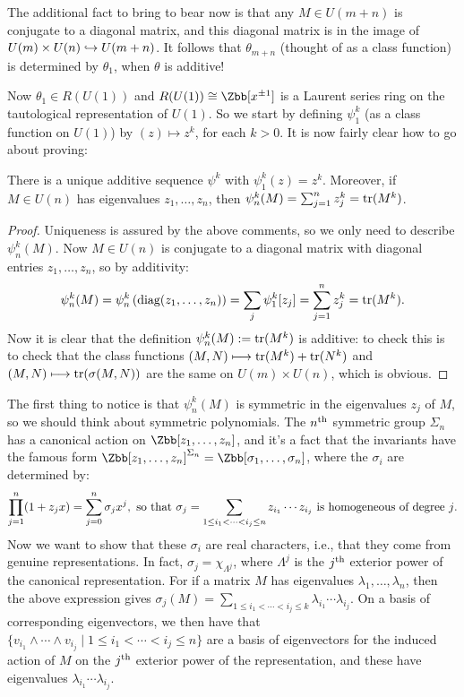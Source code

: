 The additional fact to bring to bear now is that any $M \in U(m+n)$ is conjugate to a diagonal matrix, and this diagonal matrix is in the image of $U(m) \times U(n) \hookrightarrow U(m+n)$.  It follows that $\theta_{m+n}$ (thought of as a class function) is determined by $\theta_1$, when $\theta$ is additive!

Now $\theta_1 \in R(U(1))$ and $R(U(1)) \cong \Zbb[x^{\pm 1}]$ is a Laurent series ring on the tautological representation of $U(1)$.  So we start by defining $\psi_1^k$ (as a class function on $U(1)$) by $(z)\mapsto z^k$, for each $k > 0$.  It is now fairly clear how to go about proving:
\begin{thm}
There is a unique additive sequence $\psi^k$ with $\psi^k_1(z) = z^k$. Moreover, if $M\in U(n)$ has eigenvalues $z_1,\ldots,z_n$, then $\psi_n^k(M)=\sum_{j=1}^n z^k_j=\operatorname{tr}(M^k)$.
\end{thm}
\begin{proof}
Uniqueness is assured by the above comments, so we only need to describe $\psi_n^k(M)$. Now $M \in U(n)$ is conjugate to a diagonal matrix with diagonal entries $z_1, \ldots, z_n$, so by additivity:
\[\psi^k_n(M) = \psi^k_n \left( \textup{diag}(z_1,\ldots,z_n)\right) = \sum_j \psi^k_1 [z_j] = \sum_{j=1}^n z_j^k = \operatorname{tr}(M^k).\]
Now it is clear that the definition $\psi^k_n(M) \mathrel{:=} \operatorname{tr}(M^k)$ is additive: to check this is to check that the class functions $(M,N)\longmapsto \operatorname{tr}(M^k)+\operatorname{tr}(N^k)$ and $(M,N)\longmapsto \operatorname{tr}(\sigma(M,N))$ are the same on $U(m)\times U(n)$, which is obvious.
\end{proof}
The first thing to notice is that $\psi^k_n(M)$ is symmetric in the eigenvalues $z_j$ of $M$, so we should think about symmetric polynomials. The $n^\textup{th}$ symmetric group $\Sigma_n$ has a canonical action on $\Zbb[z_1, \ldots, z_n]$, and it's a fact that the invariants have the famous form $\Zbb[z_1, \ldots, z_n]^{\Sigma_n} = \Zbb[\sigma_1, \ldots, \sigma_n]$, where the $\sigma_i$ are determined by:
\[\prod_{j=1}^n (1+z_j x) = \sum_{j=0}^n \sigma_j x^j,\textup{ so that }
\sigma_j = \sum_{ 1\leq i_1 < \cdots < i_j\leq n }z_{i_1}\cdots z_{i_j}\text{ is homogeneous of degree $j$.}\]
Now we want to show that these $\sigma_i$ are real characters, i.e., that they come from genuine representations.  In fact, $\sigma_j = \chi_{\Lambda^j}$, where $\Lambda^j$ is the $j^\textup{th}$ exterior
power of the canonical representation.
For if a matrix $M$ has eigenvalues $\lambda_1, \ldots, \lambda_n$, then the above expression gives $\sigma_j(M) = \sum_{1 \le i_1 < \cdots < i_j \le k} \lambda_{i_1} \cdots \lambda_{i_j}$.  On a basis of corresponding eigenvectors, we then have that $\{v_{i_1} \wedge \cdots \wedge v_{i_j} \mid 1 \le i_1 < \cdots < i_j \le n\}$ are a basis of eigenvectors for the induced action of $M$ on the $j^\textup{th}$ exterior power of the representation, and these have eigenvalues $\lambda_{i_1} \cdots \lambda_{i_j}$.

